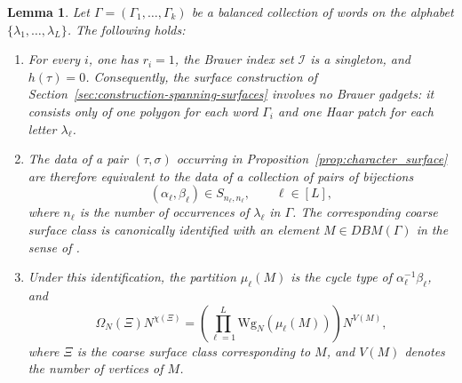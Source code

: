 \documentclass[11pt,a4paper,reqno]{article}
\newtheorem{lemma}[theorem]{Lemma}
\theoremstyle{definition}
\theoremstyle{remark}
\begin{document}
\begin{lemma}\label{lem:trace-specialization-DBM}
Let $\Gamma=(\Gamma_1,\dots,\Gamma_k)$ be a balanced collection of words on the alphabet $\{\lambda_1,\dots,\lambda_L\}$. The following holds:
\begin{enumerate}
\item For every $i$, one has $r_i=1$, the Brauer index set $\mathcal I$ is a singleton, and $h(\tau)=0$. Consequently, the surface construction of Section~\ref{sec:construction-spanning-surfaces} involves no Brauer gadgets: it consists only of one polygon for each word $\Gamma_i$ and one Haar patch for each letter $\lambda_\ell$.

\item The data of a pair $(\tau,\sigma)$ occurring in Proposition~\ref{prop:character_surface} are therefore equivalent to the data of a collection of pairs of bijections
\[
(\alpha_\ell,\beta_\ell)\in S_{n_\ell,n_\ell},
\qquad \ell\in[L],
\]
where $n_\ell$ is the number of occurrences of $\lambda_\ell$ in $\Gamma$. The corresponding coarse surface class is canonically identified with an element $M\in DBM(\Gamma)$ in the sense of \cite{CPS25}.

\item Under this identification, the partition $\mu_\ell(M)$ is the cycle type of $\alpha_\ell^{-1}\beta_\ell$, and
\[
\Omega_N(\Xi)N^{\chi(\Xi)}=\left(\prod_{\ell=1}^L \mathrm{Wg}_N(\mu_\ell(M))\right)N^{V(M)},
\]
where $\Xi$ is the coarse surface class corresponding to $M$, and $V(M)$ denotes the number of vertices of $M$.
\end{enumerate}
\end{lemma}
\end{document}
